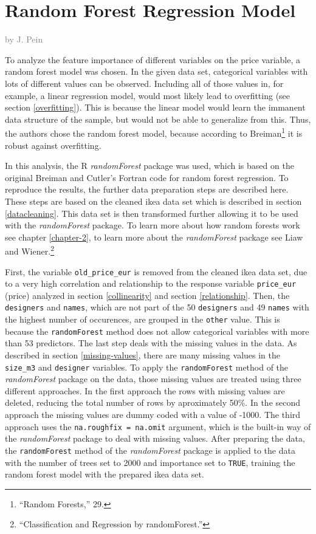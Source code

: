\documentclass[a4paper, nobind]{templates/ociamthesis}
\begin{document}
\hypertarget{rf}{%
\section{Random Forest Regression Model}\label{rf}}

\textcolor{gray}{by J. Pein}

To analyze the feature importance of different variables on the price variable, a random forest model was chosen. In the given data set, categorical variables with lots of different values can be observed. Including all of those values in, for example, a linear regression model, would most likely lead to overfitting (see section \ref{overfitting}). This is because the linear model would learn the immanent data structure of the sample, but would not be able to generalize from this. Thus, the authors chose the random forest model, because according to Breiman\footnote{``Random Forests,'' 29.} it is robust against overfitting.

In this analysis, the R \emph{randomForest} package was used, which is based on the original Breiman and Cutler's Fortran code for random forest regression. To reproduce the results, the further data preparation steps are described here. These steps are based on the cleaned ikea data set which is described in section \ref{datacleaning}. This data set is then transformed further allowing it to be used with the \emph{randomForest} package. To learn more about how random forests work see chapter \ref{chapter-2}, to learn more about the \emph{randomForest} package see Liaw and Wiener.\footnote{``Classification and Regression by randomForest.''}

First, the variable \texttt{old\_price\_eur} is removed from the cleaned ikea data set, due to a very high correlation and relationship to the response variable \texttt{price\_eur} (price) analyzed in section \ref{collinearity} and section \ref{relationship}. Then, the \texttt{designers} and \texttt{names}, which are not part of the 50 \texttt{designers} and 49 \texttt{names} with the highest number of occurences, are grouped in the \texttt{other} value. This is because the \texttt{randomForest} method does not allow categorical variables with more than 53 predictors. The last step deals with the missing values in the data. As described in section \ref{missing-values}, there are many missing values in the \texttt{size\_m3} and \texttt{designer} variables. To apply the \texttt{randomForest} method of the \emph{randomForest} package on the data, those missing values are treated using three different approaches. In the first approach the rows with missing values are deleted, reducing the total number of rows by aproximately 50\%. In the second approach the missing values are dummy coded with a value of -1000. The third approach uses the \texttt{na.roughfix\ =\ na.omit} argument, which is the built-in way of the \emph{randomForest} package to deal with missing values.
After preparing the data, the \texttt{randomForest} method of the \emph{randomForest} package is applied to the data with the number of trees set to 2000 and importance set to \texttt{TRUE}, training the random forest model with the prepared ikea data set.
\end{document}
